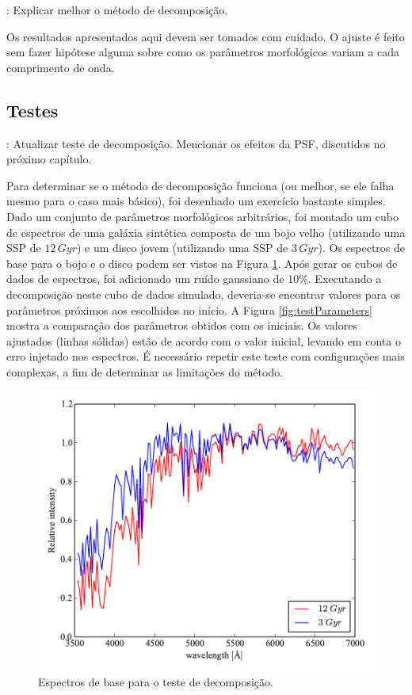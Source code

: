\TODO: Explicar melhor o método de decomposição.

Os resultados apresentados aqui devem ser tomados com cuidado. O ajuste é feito
sem fazer hipótese alguma sobre como os parâmetros morfológicos variam a cada
comprimento de onda.


\subsection{Testes}

\TODO: Atualizar teste de decomposição. Mencionar os efeitos da PSF, discutidos
no próximo capítulo.

Para determinar se o método de decomposição funciona (ou melhor, se ele falha
mesmo para o caso mais básico), foi desenhado um exercício bastante simples.
Dado um conjunto de parâmetros morfológicos arbitrários, foi montado um cubo de
espectros de uma galáxia sintética composta de um bojo velho (utilizando uma SSP
de $12\,Gyr$) e um disco jovem (utilizando uma SSP de $3\,Gyr$). Os espectros de
base para o bojo e o disco podem ser vistos na Figura \ref{fig:testSpectra}.
Após gerar os cubos de dados de espectros, foi adicionado um ruído gaussiano de
$10\%$. Executando a decomposição neste cubo de dados simulado, deveria-se
encontrar valores para os parâmetros próximos aos escolhidos no início. A Figura
\ref{fig:testParameters} mostra a comparação dos parâmetros obtidos com os
iniciais. Os valores ajustados (linhas sólidas) estão de acordo com o valor
inicial, levando em conta o erro injetado nos espectros. É necessário repetir
este teste com configurações mais complexas, a fim de determinar as limitações
do método.


\begin{figure}
	\includegraphics[width=0.7\columnwidth]{figuras/test-spectra}
	\caption[Espectros de base para o teste de decomposição] {Espectros de base
	para o teste de decomposição.}
	\label{fig:testSpectra}
\end{figure}


